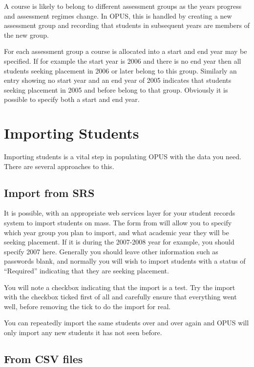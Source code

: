 \documentclass[12 pt]{book}
\begin{document}
A course is likely to belong to different assessment groups as the years progress and
assessment regimes change. In OPUS, this is handled by creating a new assessment group
and recording that students in subsequent years are members of the new group.

For each assessment group a course is allocated into a start and end year may be
specified. If for example the start year is 2006 and there is no end year then all
students seeking placement in 2006 or later belong to this group. Similarly an entry
showing no start year and an end year of 2005 indicates that students seeking
placement in 2005 and before belong to that group. Obviously it is possible to
specify both a start and end year.

\chapter{Importing Students}

Importing students is a vital step in populating OPUS with the data you need. There are several
approaches to this.

\section{Import from SRS}

It is possible, with an appropriate web services layer for your student records system to import
students on mass. The form from  will allow
you to specify which year group you plan to import, and what academic year they will be seeking
placement. If it is during the 2007-2008 year for example, you should specify 2007 here. Generally
you should leave other information such as passwords blank, and normally you will wish to
import students with a status of ``Required'' indicating that they are seeking placement.

You will note a checkbox indicating that the import is a test. Try the import with the checkbox
ticked first of all and carefully ensure that everything went well, before removing the tick
to do the import for real.

You can repeatedly import the same students over and over again and OPUS will only import
any new students it has not seen before.

\section{From CSV files}
\end{document}
